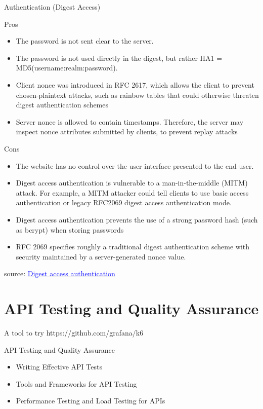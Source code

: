 \documentclass{beamer}
\begin{document}
\begin{frame}[t]{Authentication (Digest Access)}
    \scriptsize

	Pros
  \begin{itemize}
    \item The password is not sent clear to the server.
    \item The password is not used directly in the digest, but rather HA1 = MD5(username:realm:password).
    \item Client nonce was introduced in RFC 2617, which allows the client to prevent chosen-plaintext attacks, such as rainbow tables that could otherwise threaten digest authentication schemes
    \item Server nonce is allowed to contain timestamps. Therefore, the server may inspect nonce attributes submitted by clients, to prevent replay attacks
  \end{itemize}
	Cons
  \begin{itemize}
    \item<1-> The website has no control over the user interface presented to the end user.
    \item<2-> Digest access authentication is vulnerable to a man-in-the-middle (MITM) attack. For example, a MITM attacker could tell clients to use basic access authentication or legacy RFC2069 digest access authentication mode.
    \item<3-> Digest access authentication prevents the use of a strong password hash (such as bcrypt) when storing passwords 
    \item<4-> RFC 2069 specifies roughly a traditional digest authentication scheme with security maintained by a server-generated nonce value.
  \end{itemize}

\vspace{2mm}
\tiny source: \href{https://en.wikipedia.org/wiki/Digest_access_authentication} {\textcolor{blue}{Digest access authentication}} 	
\end{frame}




\section{API Testing and Quality Assurance}
A tool to try https://github.com/grafana/k6
\begin{frame}{API Testing and Quality Assurance}
  \begin{itemize}
    \item Writing Effective API Tests
    \item Tools and Frameworks for API Testing
    \item Performance Testing and Load Testing for APIs
  \end{itemize}
\end{frame}
\end{document}
